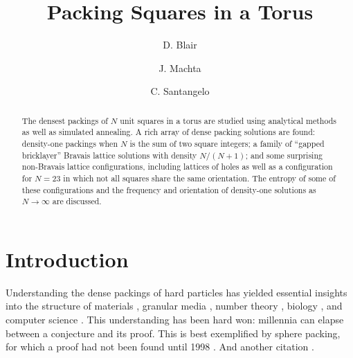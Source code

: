 \documentclass[preprint,aps]{revtex4}
\begin{document}
\title{Packing Squares in a Torus}

\author{D. Blair}

\author{J. Machta}

\author{C. Santangelo}

\begin{abstract}
The densest packings of $N$ unit squares in a torus are studied using analytical methods as well as simulated annealing.  A rich array of dense packing solutions are found: density-one packings when $N$ is the sum of two square integers; a family of ``gapped bricklayer'' Bravais lattice solutions with density $N/(N+1)$; and some surprising non-Bravais lattice configurations, including lattices of holes as well as a configuration for $N=23$ in which not all squares share the same orientation.  The entropy of some of these configurations and the frequency and orientation of density-one solutions as $N \rightarrow \infty$ are discussed.

\end{abstract} 
\maketitle

%
\section{Introduction}

Understanding the dense packings of hard particles has yielded essential insights into the structure of materials \cite{Bernal1964,Zallen1983,Torquato2002,Chaikin2000}, granular media \cite{Torquato2002,Mehta1994}, number theory \cite{COHNa,Conway1999}, biology 
\cite{Gevertz2008,Purohit2003}, and computer science \cite{Johnson1974,Lodi2002}. This understanding has been hard won: millennia can elapse between a conjecture and its proof. This is best exemplified by sphere packing, for which a proof had not been found until 1998 \cite{HALESa}. And another citation \cite{Wojciechowski2004}.
\end{document}
